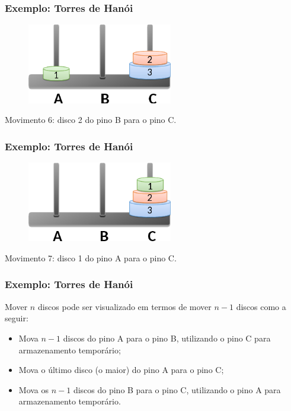 \documentclass[aspectratio=169]{beamer}
\begin{document}

\begin{frame}
\frametitle{Exemplo: Torres de Hanói}

\begin{figure}[!h]
  \centering
  \includegraphics[width=180pt]{imgs/exemplo_torre_hanoi7.png}
  \label{fig_torre_hanoi8}
\end{figure}
Movimento 6: disco 2 do pino B para o pino C.
\end{frame}


\begin{frame}
\frametitle{Exemplo: Torres de Hanói}

\begin{figure}[!h]
  \centering
  \includegraphics[width=180pt]{imgs/exemplo_torre_hanoi8.png}
  \label{fig_torre_hanoi9}
\end{figure}
Movimento 7: disco 1 do pino A para o pino C.
\end{frame}


\begin{frame}
\frametitle{Exemplo: Torres de Hanói}
Mover $n$ discos pode ser visualizado em termos de mover $n-1$ discos como a seguir:
\begin{itemize}
 \item Mova $n-1$ discos do pino A para o pino B, utilizando o pino C para armazenamento temporário;
 \item Mova o último disco (o maior) do pino A para o pino C;
 \item Mova os $n-1$ discos do pino B para o pino C, utilizando o pino A para armazenamento temporário.
\end{itemize}
\end{frame}
\end{document}
